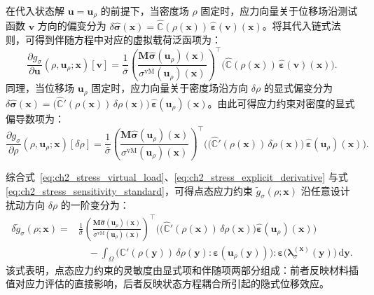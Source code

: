 在代入状态解 $\boldsymbol{u} = \boldsymbol{u}_\rho$ 的前提下，当密度场 $\rho$ 固定时，应力向量关于位移场沿测试函数 $\boldsymbol{v}$ 方向的偏变分为 $\delta\hat{\boldsymbol{\sigma}}(\boldsymbol{x}) = \hat{\mathbb{C}}(\rho(\boldsymbol{x}))\,\hat{\boldsymbol{\varepsilon}}(\boldsymbol{v})(\boldsymbol{x})$。将其代入链式法则，可得到伴随方程中对应的虚拟载荷泛函项为：
\begin{equation} \label{eq:ch2_stress_virtual_load}
	\frac{\partial g_\sigma}{\partial \boldsymbol{u}}(\rho,\boldsymbol{u}_\rho;\boldsymbol{x})[\boldsymbol{v}] = \frac{1}{\bar{\sigma}} \left(\frac{\boldsymbol{M}\hat{\boldsymbol{\sigma}}(\boldsymbol{u}_\rho)(\boldsymbol{x})}{\sigma^{\mathrm{vM}}(\boldsymbol{u}_\rho)(\boldsymbol{x})}\right)^{\!\top} \Big(\hat{\mathbb{C}}(\rho(\boldsymbol{x}))\,\hat{\boldsymbol{\varepsilon}}(\boldsymbol{v})(\boldsymbol{x})\Big).
\end{equation}
同理，当位移场 $\boldsymbol{u}_\rho$ 固定时，应力向量关于密度场沿方向 $\delta\rho$ 的显式偏变分为 $\delta\hat{\boldsymbol{\sigma}}(\boldsymbol{x}) = \big(\hat{\mathbb{C}}'(\rho(\boldsymbol{x}))\,\delta\rho(\boldsymbol{x})\big)\, \hat{\boldsymbol{\varepsilon}}(\boldsymbol{u}_\rho)(\boldsymbol{x})$。由此可得应力约束对密度的显式偏导数项为：
\begin{equation} \label{eq:ch2_stress_explicit_derivative}
	\frac{\partial g_\sigma}{\partial \rho}(\rho,\boldsymbol{u}_\rho;\boldsymbol{x})[\delta\rho] = \frac{1}{\bar{\sigma}} \left(\frac{\boldsymbol{M}\hat{\boldsymbol{\sigma}}(\boldsymbol{u}_\rho)(\boldsymbol{x})}{\sigma^{\mathrm{vM}}(\boldsymbol{u}_\rho)(\boldsymbol{x})}\right)^{\!\top} \Big(\big(\hat{\mathbb{C}}'(\rho(\boldsymbol{x}))\,\delta\rho(\boldsymbol{x})\big)\, \hat{\boldsymbol{\varepsilon}}(\boldsymbol{u}_\rho)(\boldsymbol{x})\Big).
\end{equation}

综合式~\eqref{eq:ch2_stress_virtual_load}、\eqref{eq:ch2_stress_explicit_derivative} 与式 \eqref{eq:ch2_stress_sensitivity_standard}，可得点态应力约束 $\tilde g_\sigma(\rho;\boldsymbol{x})$ 沿任意设计扰动方向 $\delta \rho$ 的一阶变分为：
\begin{equation} \label{eq:ch2_stress_total_variation}
	\begin{aligned} 
		\delta \tilde g_\sigma(\rho;\boldsymbol{x}) ={}& \frac{1}{\bar{\sigma}} \left( \frac{ \boldsymbol{M}\hat{\boldsymbol{\sigma}}(\boldsymbol{u}_\rho)(\boldsymbol{x}) }{ \sigma^{\mathrm{vM}}(\boldsymbol{u}_\rho)(\boldsymbol{x}) } \right)^\top \Big( \big( \hat{\mathbb{C}}'(\rho(\boldsymbol{x}))\,\delta \rho(\boldsymbol{x}) \big) \hat{\boldsymbol{\varepsilon}}(\boldsymbol{u}_\rho)(\boldsymbol{x}) \Big) \\ &\quad - \int_\Omega \big( \mathbb{C}'(\rho(\boldsymbol{y}))\,\delta \rho(\boldsymbol{y}) : \boldsymbol{\varepsilon}(\boldsymbol{u}_\rho(\boldsymbol{y})) \big) : \boldsymbol{\varepsilon}\big(\boldsymbol{\lambda}_\sigma^{(\boldsymbol{x})}(\boldsymbol{y})\big) \,\mathrm{d}\boldsymbol{y}. 
	\end{aligned}
\end{equation}
该式表明，点态应力约束的灵敏度由显式项和伴随项两部分组成：前者反映材料插值对应力评估的直接影响，后者反映状态方程耦合所引起的隐式位移效应。


